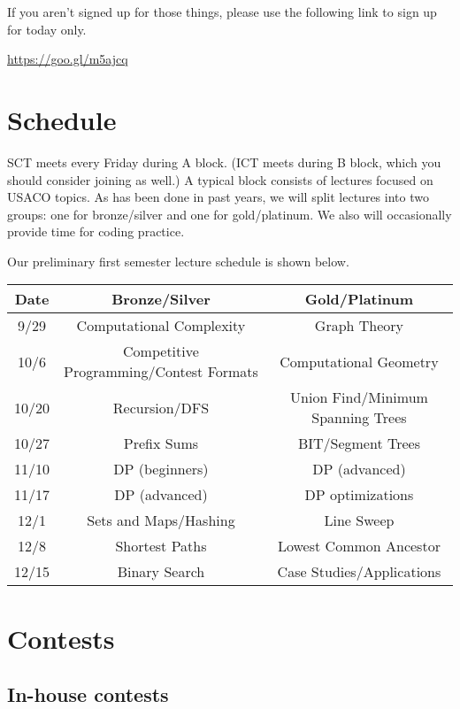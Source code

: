 \documentclass{article}
\begin{document}
If you aren't signed up for those things, please use the following link to sign up for today only.

\begin{center}
\Large{\url{https://goo.gl/m5ajcq}}
\end{center}


\section{Schedule}

SCT meets every Friday during A block. (ICT meets during B block, which you should consider joining as well.) A typical block consists of lectures focused on USACO topics. As has been done in past years, we will split lectures into two groups: one for bronze/silver and one for gold/platinum. We also will occasionally provide time for coding practice.

Our preliminary first semester lecture schedule is shown below.

\begin{center}
\begin{tabular}{ |c|c|c| }
\hline
Date & Bronze/Silver & Gold/Platinum\\
\hline
9/29 &	Computational Complexity & Graph Theory\\
10/6 &	Competitive Programming/Contest Formats	&Computational Geometry\\
10/20&	Recursion/DFS	&Union Find/Minimum Spanning Trees\\
10/27&	Prefix Sums	&BIT/Segment Trees\\
11/10&	DP (beginners)	&DP (advanced)\\
11/17&	DP (advanced)	&DP optimizations\\
12/1&	Sets and Maps/Hashing	&Line Sweep\\
12/8&	Shortest Paths	&Lowest Common Ancestor\\
12/15&	Binary Search	&Case Studies/Applications\\
\hline
\end{tabular}
\end{center}

\section{Contests}

\subsection{In-house contests}
\end{document}
